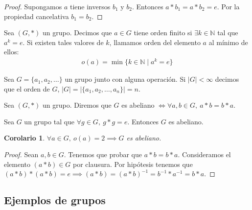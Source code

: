 \documentclass{book}
\newtheorem*{cor}{Corolario}
\theoremstyle{definition}
\theoremstyle{remark}
\newcommand{\inv}[1]{#1^{-1}}
\begin{document}
\begin{proof}
	Supongamos $a$ tiene inversos $b_1$ y $b_2$. Entonces $a \ast b_1 = a \ast b_2 = e$. Por la propiedad cancelativa $b_1 = b_2$.
\end{proof}

\begin{dfn}
	Sea $(G, \ast)$ un grupo. Decimos que $a \in G$ tiene orden finito si $\exists k \in \mathbb{N}$ tal que $a^k = e$.
	Si existen tales valores de $k$, llamamos orden del elemento $a$ al mínimo de ellos:
	\begin{align}
		o(a) = \min \{k \in \mathbb{N} \mid a^k = e \}
	\end{align}
\end{dfn}

\begin{dfn}
	Sea $G = \{a_1, a_2, \dots \}$ un grupo junto con alguna operación. Si $|G| < \infty$ decimos que el orden de $G$, $|G| = |\{a_1, a_2, \dots, a_n\}| = n$.
\end{dfn}

\begin{dfn}
	Sea $(G, \ast)$ un grupo. Diremos que $G$ es abeliano $\iff \forall a,b \in G,\ a \ast b = b \ast a$.
\end{dfn}

\begin{thm}
	\label{thm:abelianosdeorden2}
	Sea $G$ un grupo tal que $\forall g \in G,\ g \ast g = e$. Entonces $G$ es abeliano.
\end{thm}

\begin{cor}
	$\forall a \in G,\ o(a) = 2 \implies G$ es abeliano.
\end{cor}

\begin{proof}
	Sean $a,b \in G$. Tenemos que probar que $a\ast b = b \ast a$. Consideramos el elemento $(a \ast b) \in G$ por clausura. Por hipótesis tenemos que $(a \ast b) \ast (a \ast b) = e \implies (a \ast b) = \inv{(a \ast b)} = \inv{b} \ast \inv{a} = b \ast a$.
\end{proof}

\subsection{Ejemplos de grupos}
\end{document}
